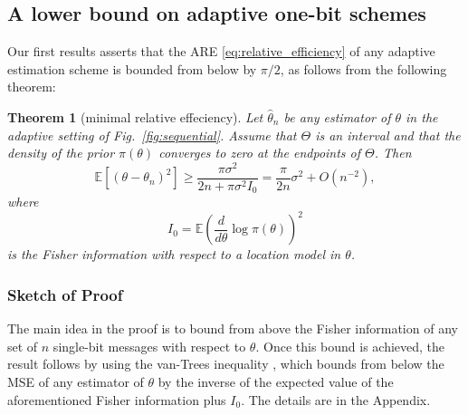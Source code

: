 \documentclass[letterpaper, conference,9pt]{IEEEtran}      %
\newtheorem{thm}{\bf{Theorem}}
\begin{document}

\subsection{A lower bound on adaptive one-bit schemes}
Our first results asserts that the ARE \eqref{eq:relative_efficiency} of any adaptive estimation scheme is bounded from below by $\pi/2$, as follows from the following theorem:
\begin{thm}[minimal relative effeciency] \label{thm:adpative_lower_bound}
Let $\widehat{\theta}_n$ be any estimator of $\theta$ in the adaptive setting of Fig.~\ref{fig:sequential}. Assume that $\Theta$ is an interval and that the density of the prior $\pi(\theta)$ converges to zero at the endpoints of $\Theta$. Then
\[
\mathbb E\left[ (\theta-\theta_n)^2 \right] \geq  \frac{\pi \sigma^2 }{2n +\pi \sigma^2  I_0}  =  \frac{\pi}{2n}\sigma^2+O(n^{-2}),
\]
where 
\[
I_0 = \mathbb E \left( \frac{d}{d\theta} \log \pi (\theta) \right)^2
\]
is the Fisher information with respect to a location model in $\theta$. 
\end{thm}

\subsubsection*{Sketch of Proof}
The main idea in the proof is to bound from above the Fisher information of any set of $n$ single-bit messages with respect to $\theta$. Once this bound is achieved, the result follows by using the van-Trees inequality \cite[Thm. 2.13]{tsybakov2008introduction},\cite{gill1995applications} which bounds from below the MSE of any estimator of $\theta$ by the inverse of the expected value of the aforementioned Fisher information plus $I_0$. The details are in the Appendix.\\
\end{document}
